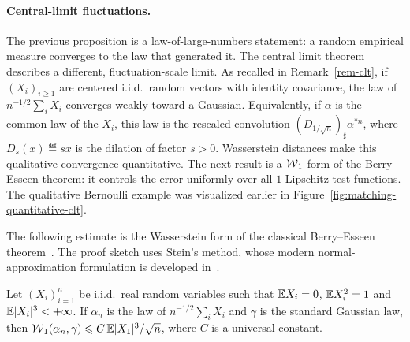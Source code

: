 \paragraph{Central-limit fluctuations.}
The previous proposition is a law-of-large-numbers statement: a random empirical measure converges to the law that generated it. The central limit theorem describes a different, fluctuation-scale limit. As recalled in Remark~\ref{rem-clt}, if \((X_i)_{i\geq1}\) are centered i.i.d.\ random vectors with identity covariance, the law of \(n^{-1/2}\sum_i X_i\) converges weakly toward a Gaussian. Equivalently, if \(\alpha\) is the common law of the \(X_i\), this law is the rescaled convolution \((D_{1/\sqrt n})_\sharp\alpha^{*n}\), where \(D_s(x)\eqdef sx\) is the dilation of factor \(s>0\). Wasserstein distances make this qualitative convergence quantitative. The next result is a \(\operatorname{\mathcal{W}}_1\) form of the Berry--Esseen theorem: it controls the error uniformly over all \(1\)-Lipschitz test functions. The qualitative Bernoulli example was visualized earlier in Figure~\ref{fig:matching-quantitative-clt}.

The following estimate is the Wasserstein form of the classical Berry--Esseen theorem~\cite{berry1941accuracy,esseen1942liapunoff}. The proof sketch uses Stein's method, whose modern normal-approximation formulation is developed in~\cite{chen2011normal}.

\begin{prop}\label{prop-berry-esseen-w1}
	Let $(X_i)_{i=1}^n$ be i.i.d.\ real random variables such that $\mathbb{E} X_i=0$, $\mathbb{E} X_i^2=1$ and $\mathbb{E} |X_i|^3<+\infty$. If $\alpha_n$ is the law of $n^{-1/2}\sum_i X_i$ and $\gamma$ is the standard Gaussian law, then $\operatorname{\mathcal{W}}_1(\alpha_n,\gamma)\leqslant C\,\mathbb{E} |X_1|^3/\sqrt n$, where $C$ is a universal constant.
\end{prop}

